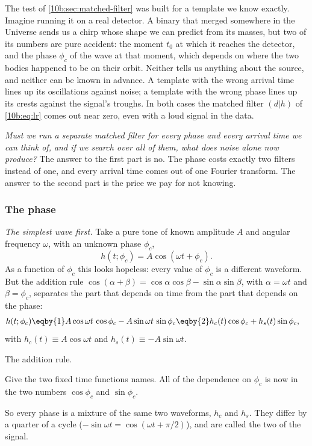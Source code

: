 The test of \cref{10b:sec:matched-filter} was built for a template we know exactly. Imagine running it on a real
detector. A binary that merged somewhere in the Universe sends us a chirp whose shape we can predict from its masses,
but two of its numbers are pure accident: the moment $t_0$ at which it reaches the detector, and the phase $\phi_c$ of
the wave at that moment, which depends on where the two bodies happened to be on their orbit. Neither tells us
anything about the source, and neither can be known in advance. A template with the wrong arrival time lines up its
oscillations against noise; a template with the wrong phase lines up its crests against the signal's troughs. In both
cases the matched filter $(d|h)$ of \eqref{10b:eq:lr} comes out near zero, even with a loud signal in the data.

\emph{Must we run a separate matched filter for every phase and every arrival time we can
think of, and if we search over all of them, what does noise alone now produce?} The answer to the first part is no.
The phase costs exactly two filters instead of one, and every arrival time comes out of one Fourier transform. The
answer to the second part is the price we pay for not knowing.

\subsubsection*{The phase}

\emph{The simplest wave first.} Take a pure tone of known amplitude $A$ and angular frequency $\omega$, with an
unknown phase $\phi_c$,
\begin{equation}
  h(t;\phi_c)=A\cos(\omega t+\phi_c).
  \label{10b:eq:tone}
\end{equation}
As a function of $\phi_c$ this looks hopeless: every value of $\phi_c$ is a different waveform. But the addition rule
$\cos(\alpha+\beta)=\cos\alpha\cos\beta-\sin\alpha\sin\beta$, with $\alpha=\omega t$ and $\beta=\phi_c$, separates the
part that depends on time from the part that depends on the phase:
\begin{align}
  h(t;\phi_c)
  &\eqby{1}A\cos\omega t\,\cos\phi_c-A\sin\omega t\,\sin\phi_c
   \eqby{2}h_c(t)\cos\phi_c+h_s(t)\sin\phi_c,
  \label{10b:eq:quadratures}
\end{align}
with $h_c(t)\equiv A\cos\omega t$ and $h_s(t)\equiv-A\sin\omega t$.
\begin{explain}
  \item The addition rule.
  \item Give the two fixed time functions names. All of the dependence on $\phi_c$ is now in the two numbers
        $\cos\phi_c$ and $\sin\phi_c$.
\end{explain}
So every phase is a mixture of the same two waveforms, $h_c$ and $h_s$. They differ by a quarter of a cycle
($-\sin\omega t=\cos(\omega t+\pi/2)$), and are called the two  of the signal.

